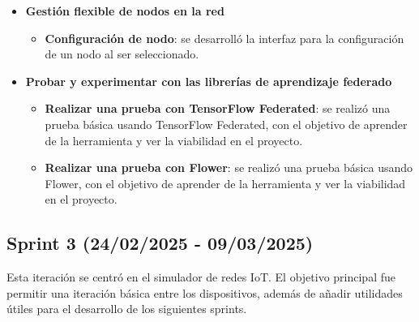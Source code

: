 \begin{itemize}
    \item \textbf{Gestión flexible de nodos en la red}
    \begin{itemize}
        \item \textbf{Configuración de nodo}: se desarrolló la interfaz para la configuración de un nodo al ser seleccionado.
    \end{itemize}
    \item \textbf{Probar y experimentar con las librerías de aprendizaje federado}
    \begin{itemize}
        \item \textbf{Realizar una prueba con TensorFlow Federated}: se realizó una prueba básica usando TensorFlow Federated, con el objetivo de aprender de la herramienta y ver la viabilidad en el proyecto.
        \item \textbf{Realizar una prueba con Flower}: se realizó una prueba básica usando Flower, con el objetivo de aprender de la herramienta y ver la viabilidad en el proyecto.
    \end{itemize}
\end{itemize}

\subsection{Sprint 3 (24/02/2025 - 09/03/2025)}
\label{subsec:TercerSprint}
Esta iteración se centró en el simulador de redes IoT. El objetivo principal fue permitir una iteración básica entre los dispositivos, además de añadir utilidades útiles para el desarrollo de los siguientes sprints.

